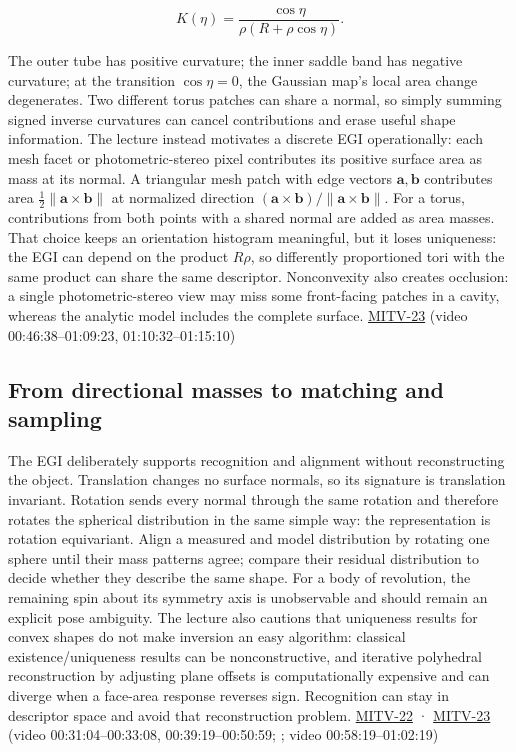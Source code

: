 \[
K(\eta)=\frac{\cos\eta}{\rho(R+\rho\cos\eta)}.
\]

The outer tube has positive curvature; the inner saddle band has negative curvature; at the transition \(\cos\eta=0\), the Gaussian map's local area change degenerates. Two different torus patches can share a normal, so simply summing signed inverse curvatures can cancel contributions and erase useful shape information. The lecture instead motivates a discrete EGI operationally: each mesh facet or photometric-stereo pixel contributes its positive surface area as mass at its normal. A triangular mesh patch with edge vectors \(\mathbf a,\mathbf b\) contributes area \(\tfrac12\|\mathbf a\times\mathbf b\|\) at normalized direction \((\mathbf a\times\mathbf b)/\|\mathbf a\times\mathbf b\|\). For a torus, contributions from both points with a shared normal are added as area masses. That choice keeps an orientation histogram meaningful, but it loses uniqueness: the EGI can depend on the product \(R\rho\), so differently proportioned tori with the same product can share the same descriptor. Nonconvexity also creates occlusion: a single photometric-stereo view may miss some front-facing patches in a cavity, whereas the analytic model includes the complete surface. \hyperref[04-visual-computing-ii-ch036-mitv-23---gaussian-image-solids-of-revolution-direction-histograms-regular-polyhedra]{MITV-23} (video 00:46:38--01:09:23, 01:10:32--01:15:10)

\subsection{From directional masses to matching and sampling}\label{04-visual-computing-ii-ch032-from-directional-masses-to-matching-and-sampling}

The EGI deliberately supports recognition and alignment without reconstructing the object. Translation changes no surface normals, so its signature is translation invariant. Rotation sends every normal through the same rotation and therefore rotates the spherical distribution in the same simple way: the representation is rotation equivariant. Align a measured and model distribution by rotating one sphere until their mass patterns agree; compare their residual distribution to decide whether they describe the same shape. For a body of revolution, the remaining spin about its symmetry axis is unobservable and should remain an explicit pose ambiguity. The lecture also cautions that uniqueness results for convex shapes do not make inversion an easy algorithm: classical existence/uniqueness results can be nonconstructive, and iterative polyhedral reconstruction by adjusting plane offsets is computationally expensive and can diverge when a face-area response reverses sign. Recognition can stay in descriptor space and avoid that reconstruction problem. \hyperref[04-visual-computing-ii-ch036-mitv-22---exterior-orientation-recovering-position-orientation-bundle-adjustment-object-shape]{MITV-22} · \hyperref[04-visual-computing-ii-ch036-mitv-23---gaussian-image-solids-of-revolution-direction-histograms-regular-polyhedra]{MITV-23} (video 00:31:04--00:33:08, 00:39:19--00:50:59; ; video 00:58:19--01:02:19)

